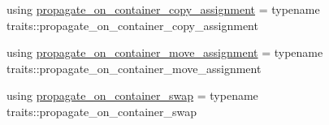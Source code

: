 \begin{DoxyCompactItemize}
\item 
using \hyperlink{structbc_1_1allocators_1_1Thrust__Allocator__Forwarder_a8059fe6fb33a144ff7e298039fed13e1}{propagate\+\_\+on\+\_\+container\+\_\+copy\+\_\+assignment} = typename traits\+::propagate\+\_\+on\+\_\+container\+\_\+copy\+\_\+assignment
\item 
using \hyperlink{structbc_1_1allocators_1_1Thrust__Allocator__Forwarder_afde660784fc764a5b030a862a4d7dc45}{propagate\+\_\+on\+\_\+container\+\_\+move\+\_\+assignment} = typename traits\+::propagate\+\_\+on\+\_\+container\+\_\+move\+\_\+assignment
\item 
using \hyperlink{structbc_1_1allocators_1_1Thrust__Allocator__Forwarder_a9c6afa39633de336f2aab1cb8dcd06bb}{propagate\+\_\+on\+\_\+container\+\_\+swap} = typename traits\+::propagate\+\_\+on\+\_\+container\+\_\+swap
\end{DoxyCompactItemize}
